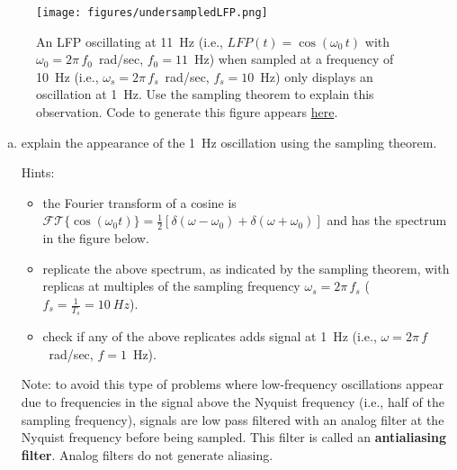 \documentclass[12pt]{article}
\begin{document}
\begin{enumerate}
        \begin{figure}
            \begin{center}
                \texttt{[image: figures/undersampledLFP.png]}

                \caption{An LFP oscillating at 11~Hz (i.e., $LFP(t)=\cos(\omega_0\,t)$ with $\omega_0=2\pi\,f_0$~rad/sec,
                $f_0=11$~Hz) when sampled at a frequency of 10~Hz (i.e.,
                $\omega_s=2\pi\,f_s$~rad/sec, $f_s=10$~Hz) only displays an
                oscillation at 1~Hz. Use the sampling theorem to explain this
                observation.  Code to generate this figure appears
                \href{https://github.com/joacorapela/neuroinformatics24/blob/master/worksheets/02_LFPs_spectralAnalysis/code/doExUndersampledLFP.py}{here}.}

            \end{center}
            \label{fig:undersampledLFP}
        \end{figure}

        \begin{enumerate}[(a)]

            \item explain the appearance of the 1~Hz oscillation using the
                sampling theorem.

                Hints:

                \begin{itemize}

                    \item the Fourier transform of a cosine is
                        $\mathcal{FT}\{\cos(\omega_0 t)\}=\frac{1}{2}[\delta(\omega-\omega_0)+\delta(\omega+\omega_0)]$
                        and has the spectrum in the figure below.
                        

                    \item replicate the above spectrum, as indicated
                        by the sampling theorem, with replicas at multiples
                        of the sampling frequency $\omega_s=2\pi\,f_s$
                        ($f_s=\frac{1}{T_s}=10~Hz$).

                    \item check if any of the above replicates adds signal at
                        1~Hz (i.e., $\omega=2\pi\,f$~rad/sec, $f=1$~Hz).
                \end{itemize}

                Note: to avoid this type of problems where low-frequency
                oscillations appear due to frequencies in the signal above the
                Nyquist frequency (i.e., half of the sampling frequency),
                signals are low pass filtered with an analog filter at the
                Nyquist frequency before being sampled. This filter is called
                an \textbf{antialiasing filter}. Analog filters do not
                generate aliasing.


\end{enumerate}
\end{enumerate}
\end{document}
